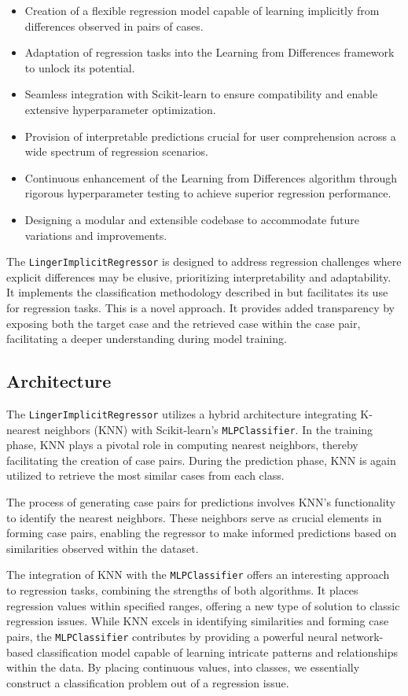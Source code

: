 \documentclass[a4paper, 12pt]{report}
\begin{document}
\begin{itemize}
\item Creation of a flexible regression model capable of learning implicitly from differences observed in pairs of cases.
\item Adaptation of regression tasks into the Learning from Differences framework to unlock its potential.
\item Seamless integration with Scikit-learn to ensure compatibility and enable extensive hyperparameter optimization.
\item Provision of interpretable predictions crucial for user comprehension across a wide spectrum of regression scenarios.
\item Continuous enhancement of the Learning from Differences algorithm through rigorous hyperparameter testing to achieve superior regression performance.
\item Designing a modular and extensible codebase to accommodate future variations and improvements.
\end{itemize}

The \texttt{LingerImplicitRegressor} is designed to address regression challenges where explicit differences may be elusive, prioritizing interpretability and adaptability. 
It implements the classification methodology described in \cite{ye2021learning} but facilitates its use for regression tasks. This is a novel approach.
It provides added transparency by exposing both the target case and the retrieved case within the case pair, facilitating a deeper understanding during model training.

\subsection{Architecture}
The \texttt{LingerImplicitRegressor} utilizes a hybrid architecture integrating K-nearest neighbors (KNN) with Scikit-learn's \texttt{MLPClassifier}. 
In the training phase, KNN plays a pivotal role in computing nearest neighbors, thereby facilitating the creation of case pairs. 
During the prediction phase, KNN is again utilized to retrieve the most similar cases from each class.

The process of generating case pairs for predictions involves KNN's functionality to identify the nearest neighbors. 
These neighbors serve as crucial elements in forming case pairs, enabling the regressor to make informed predictions based on similarities observed within the dataset.

The integration of KNN with the \texttt{MLPClassifier} offers an interesting approach to regression tasks, combining the strengths of both algorithms. 
It places regression values within specified ranges, offering a new type of solution to classic regression issues.
While KNN excels in identifying similarities and forming case pairs, the \texttt{MLPClassifier} contributes 
by providing a powerful neural network-based classification model capable of learning intricate patterns and relationships within the data. By placing continuous values,
into classes, we essentially construct a classification problem out of a regression issue.
\end{document}
